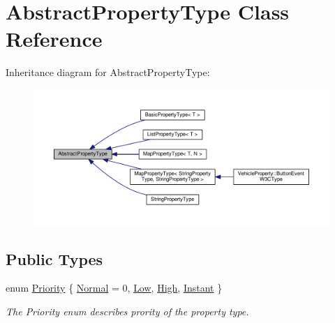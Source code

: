 \hypertarget{classAbstractPropertyType}{\section{Abstract\+Property\+Type Class Reference}
\label{classAbstractPropertyType}
}


Inheritance diagram for Abstract\+Property\+Type\+:\nopagebreak
\begin{figure}[H]
\begin{center}
\leavevmode
\includegraphics[width=350pt]{classAbstractPropertyType__inherit__graph}
\end{center}
\end{figure}
\subsection*{Public Types}
\begin{DoxyCompactItemize}
\item 
enum \hyperlink{classAbstractPropertyType_a1e513f66eb2dd2bd2cddbec16422af63}{Priority} \{ \hyperlink{classAbstractPropertyType_a1e513f66eb2dd2bd2cddbec16422af63a3412bc77a6a781fb4a832059f1fe5d9a}{Normal} = 0, 
\hyperlink{classAbstractPropertyType_a1e513f66eb2dd2bd2cddbec16422af63a611e6f3b55352cad8a1602ec8cb3c505}{Low}, 
\hyperlink{classAbstractPropertyType_a1e513f66eb2dd2bd2cddbec16422af63aabbaad7e0356d6929119fc0e17aa6ad0}{High}, 
\hyperlink{classAbstractPropertyType_a1e513f66eb2dd2bd2cddbec16422af63a5ef5703d3d1af9d204d6d2f3cf41569a}{Instant}
 \}
\begin{DoxyCompactList}\small\item\em The Priority enum describes prority of the property type. \end{DoxyCompactList}\end{DoxyCompactItemize}
